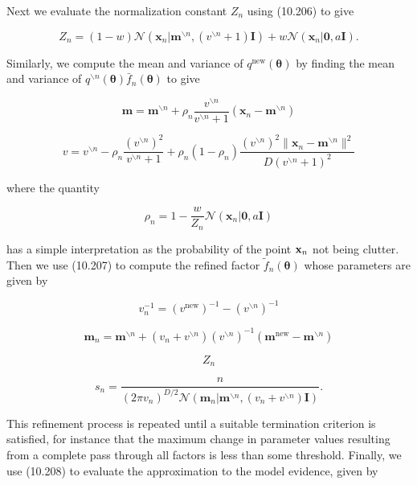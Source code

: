 \documentclass[
  10
]{article}
\begin{document}
Next we evaluate the normalization constant \(Z _ { n }\) using (10.206)
to give

\[
Z _ {n} = (1 - w) \mathcal {N} (\mathbf {x} _ {n} | \mathbf {m} ^ {\backslash n}, (v ^ {\backslash n} + 1) \mathbf {I}) + w \mathcal {N} (\mathbf {x} _ {n} | \mathbf {0}, a \mathbf {I}).\tag{10.216}
\]

Similarly, we compute the mean and variance of
\(q ^ { \mathrm { n e w } } ( \pmb { \theta } )\) by finding the mean
and variance of
\(q ^ { \backslash n } ( \pmb \theta ) \bar { f } _ { n } ( \pmb \theta )\)
to give

\[
\mathbf {m} = \mathbf {m} ^ {\backslash n} + \rho_ {n} \frac {v ^ {\backslash n}}{v ^ {\backslash n} + 1} (\mathbf {x} _ {n} - \mathbf {m} ^ {\backslash n})\tag{10.217}
\]

\[
v = v ^ {\backslash n} - \rho_ {n} \frac {(v ^ {\backslash n}) ^ {2}}{v ^ {\backslash n} + 1} + \rho_ {n} (1 - \rho_ {n}) \frac {(v ^ {\backslash n}) ^ {2} \| \mathbf {x} _ {n} - \mathbf {m} ^ {\backslash n} \| ^ {2}}{D (v ^ {\backslash n} + 1) ^ {2}}\tag{10.218}
\]

where the quantity

\[
\rho_ {n} = 1 - \frac {w}{Z _ {n}} \mathcal {N} (\mathbf {x} _ {n} | \mathbf {0}, a \mathbf {I})\tag{10.219}
\]

has a simple interpretation as the probability of the point
\({ \bf x } _ { n }\) not being clutter. Then we use (10.207) to compute
the refined factor \(\widetilde { f } _ { n } ( \pmb { \theta } )\)
whose parameters are given by

\[
{v _ {n} ^ {- 1}} = {(v ^ {\mathrm{new}}) ^ {- 1} - (v ^ {\backslash n}) ^ {- 1}}\tag{10.220}
\]

\[
\mathbf {m} _ {n} = \mathbf {m} ^ {\backslash n} + (v _ {n} + v ^ {\backslash n}) (v ^ {\backslash n}) ^ {- 1} (\mathbf {m} ^ {\mathrm{new}} - \mathbf {m} ^ {\backslash n})\tag{10.221}
\]

\[
Z _ {n}
\]

\[
{s _ {n}} = {\frac {n}{(2 \pi v _ {n}) ^ {D / 2} \mathcal {N} (\mathbf {m} _ {n} | \mathbf {m} ^ {\backslash n} , (v _ {n} + v ^ {\backslash n}) \mathbf {I})}.}\tag{10.222}
\]

This refinement process is repeated until a suitable termination
criterion is satisfied, for instance that the maximum change in
parameter values resulting from a complete pass through all factors is
less than some threshold. Finally, we use (10.208) to evaluate the
approximation to the model evidence, given by
\end{document}
